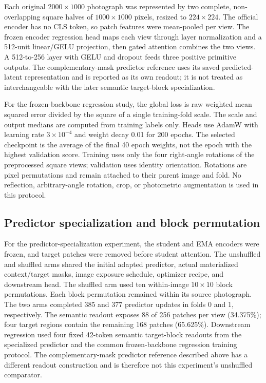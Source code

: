 \documentclass[pdflatex,a4paper,sn-nature]{sn-jnl}
\begin{document}
Each original $2000\times1000$ photograph was represented by two complete, non-overlapping square halves of $1000\times1000$ pixels, resized to $224\times224$. The official encoder has no CLS token, so patch features were mean-pooled per view. The frozen encoder regression head maps each view through layer normalization and a 512-unit linear/GELU projection, then gated attention combines the two views. A 512-to-256 layer with GELU and dropout feeds three positive primitive outputs. The complementary-mask predictor reference uses its saved predicted-latent representation and is reported as its own readout; it is not treated as interchangeable with the later semantic target-block specialization.

For the frozen-backbone regression study, the global loss is raw weighted mean squared error divided by the square of a single training-fold scale. The scale and output medians are computed from training labels only. Heads use AdamW \cite{loshchilov2019adamw} with learning rate $3\times10^{-4}$ and weight decay 0.01 for 200 epochs. The selected checkpoint is the average of the final 40 epoch weights, not the epoch with the highest validation score. Training uses only the four right-angle rotations of the preprocessed square views; validation uses identity orientation. Rotations are pixel permutations and remain attached to their parent image and fold. No reflection, arbitrary-angle rotation, crop, or photometric augmentation is used in this protocol.

\subsection{Predictor specialization and block permutation}
For the predictor-specialization experiment, the student and EMA encoders were frozen, and target patches were removed before student attention. The unshuffled and shuffled arms shared the initial adapted predictor, actual materialized context/target masks, image exposure schedule, optimizer recipe, and downstream head. The shuffled arm used ten within-image $10\times10$ block permutations. Each block permutation remained within its source photograph. The two arms completed 385 and 377 predictor updates in folds 0 and 1, respectively. The semantic readout exposes 88 of 256 patches per view (34.375\%); four target regions contain the remaining 168 patches (65.625\%). Downstream regression used four fixed 42-token semantic target-block readouts from the specialized predictor and the common frozen-backbone regression training protocol. The complementary-mask predictor reference described above has a different readout construction and is therefore not this experiment's unshuffled comparator.
\end{document}
